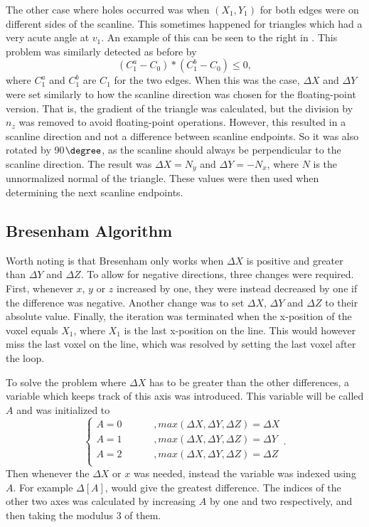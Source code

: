The other case where holes occurred was when $(X_1, Y_1)$ for both edges were on different sides of the scanline.
This sometimes happened for triangles which had a very acute angle at $v_1$.
An example of this can be seen to the right in .
This problem was similarly detected as before by
$$ (C^a_1 - C_0) * (C^b_1 - C_0) \leq 0,$$
where $C^a_1$ and $C^b_1$ are $C_1$ for the two edges.
When this was the case, $\Delta X$ and $\Delta Y$ were set similarly to how the scanline direction was chosen for the floating-point version.
That is, the gradient of the triangle was calculated, but the division by $n_z$ was removed to avoid floating-point operations.
However, this resulted in a scanline direction and not a difference between scanline endpoints.
So it was also rotated by 90$\degree$, as the scanline should always be perpendicular to the scanline direction.
The result was $\Delta X = N_y$ and $\Delta Y = -N_x$, where $N$ is the unnormalized normal of the triangle.
These values were then used when determining the next scanline endpoints.



\subsection{Bresenham Algorithm}\label{ss:bresenham-problems}
Worth noting is that Bresenham only works when $\Delta X$ is positive and greater than $\Delta Y$ and $\Delta Z$.
To allow for negative directions, three changes were required.
First, whenever $x$, $y$ or $z$ increased by one, they were instead decreased by one if the difference was negative.
Another change was to set $\Delta X$, $\Delta Y$ and $\Delta Z$ to their absolute value.
Finally, the iteration was terminated when the x-position of the voxel equals $X_1$, where $X_1$ is the last x-position on the line.
This would however miss the last voxel on the line, which was resolved by setting the last voxel after the loop.

To solve the problem where $\Delta X$ has to be greater than the other differences, a variable which keeps track of this axis was introduced.
This variable will be called $A$ and was initialized to
\begin{equation*}
\left\{
\begin{aligned}
  A = 0 \hspace{1cm} &, max(\Delta X, \Delta Y, \Delta Z) = \Delta X \\
  A = 1 \hspace{1cm} &, max(\Delta X, \Delta Y, \Delta Z) = \Delta Y \\
  A = 2 \hspace{1cm} &, max(\Delta X, \Delta Y, \Delta Z) = \Delta Z \\
\end{aligned}
\right.
.
\end{equation*}
Then whenever the $\Delta X$ or $x$ was needed, instead the variable was indexed using $A$.
For example $\Delta [A]$, would give the greatest difference.
The indices of the other two axes was calculated by increasing $A$ by one and two respectively, and then taking the modulus 3 of them.

